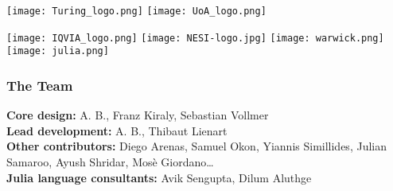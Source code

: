 \documentclass[t]{beamer}
\newcommand\dff{\bf\color{dkgreen}}
\begin{document}
\begin{frame}
  \vspace{0\baselineskip}
  \begin{center}
    \texttt{[image: Turing\_logo.png]}
    \texttt{[image: UoA\_logo.png]}

    \texttt{[image: IQVIA\_logo.png]}
    \texttt{[image: NESI-logo.jpg]}
    \texttt{[image: warwick.png]}
    \texttt{[image: julia.png]}
  \end{center}
\end{frame}

\begin{frame}
  \frametitle{The Team}

  {\small
    {\dff Core design:} A. B., Franz Kiraly, Sebastian Vollmer\\[1\baselineskip]

    {\dff Lead development:} A. B., Thibaut Lienart \\[1\baselineskip]

    {\dff Other contributors:} Diego Arenas, Samuel Okon, Yiannis Simillides, Julian Samaroo, Ayush Shridar, Mosè Giordano\ldots \\[1\baselineskip]

    {\dff Julia language consultants:} Avik Sengupta, Dilum Aluthge\\[1\baselineskip]}

\end{frame}



\end{document}
